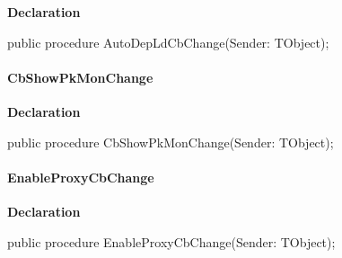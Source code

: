 \documentclass{report}
\newif\ifpdf
\begin{document}
\label{manager.TMnFrm-AutoDepLdCbChange}
\begin{list}{}{
\setlength{\itemindent}{0cm}
\setlength{\listparindent}{0cm}
\setlength{\leftmargin}{\evensidemargin}
\addtolength{\leftmargin}{\tmplength}
\settowidth{\labelsep}{X}
\addtolength{\leftmargin}{\labelsep}
\setlength{\labelwidth}{\tmplength}
}
\item[\textbf{Declaration}\hfill]
\ifpdf
\begin{flushleft}
\fi
\begin{ttfamily}
public procedure AutoDepLdCbChange(Sender: TObject);\end{ttfamily}

\ifpdf
\end{flushleft}
\fi

\end{list}
\paragraph*{CbShowPkMonChange}\hspace*{\fill}

\label{manager.TMnFrm-CbShowPkMonChange}
\begin{list}{}{
\setlength{\itemindent}{0cm}
\setlength{\listparindent}{0cm}
\setlength{\leftmargin}{\evensidemargin}
\addtolength{\leftmargin}{\tmplength}
\settowidth{\labelsep}{X}
\addtolength{\leftmargin}{\labelsep}
\setlength{\labelwidth}{\tmplength}
}
\item[\textbf{Declaration}\hfill]
\ifpdf
\begin{flushleft}
\fi
\begin{ttfamily}
public procedure CbShowPkMonChange(Sender: TObject);\end{ttfamily}

\ifpdf
\end{flushleft}
\fi

\end{list}
\paragraph*{EnableProxyCbChange}\hspace*{\fill}

\label{manager.TMnFrm-EnableProxyCbChange}
\begin{list}{}{
\setlength{\itemindent}{0cm}
\setlength{\listparindent}{0cm}
\setlength{\leftmargin}{\evensidemargin}
\addtolength{\leftmargin}{\tmplength}
\settowidth{\labelsep}{X}
\addtolength{\leftmargin}{\labelsep}
\setlength{\labelwidth}{\tmplength}
}
\item[\textbf{Declaration}\hfill]
\ifpdf
\begin{flushleft}
\fi
\begin{ttfamily}
public procedure EnableProxyCbChange(Sender: TObject);\end{ttfamily}

\ifpdf
\end{flushleft}
\fi

\end{list}
\end{document}

